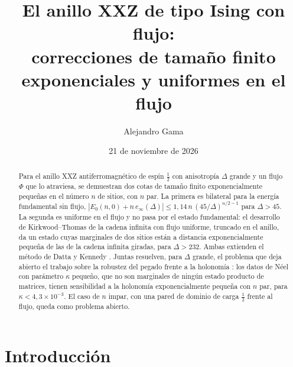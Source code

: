 \documentclass[11pt,a4paper]{article}
\title{El anillo XXZ de tipo Ising con flujo:\\ correcciones de tamaño finito exponenciales y uniformes en el flujo}
\author{Alejandro Gama}
\date{21 de noviembre de 2026}
\theoremstyle{remark}
\begin{document}
\maketitle

\begin{abstract}
Para el anillo XXZ antiferromagnético de espín $\tfrac12$ con anisotropía $\Delta$ grande y un flujo
$\Phi$ que lo atraviesa, se demuestran dos cotas de tamaño finito exponencialmente pequeñas en el
número $n$ de sitios, con $n$ par. La primera es bilateral para la energía fundamental sin flujo,
$|E_0(n,0)+n\,e_\infty(\Delta)|\le1{,}14\,n\,(45/\Delta)^{n/2-1}$ para $\Delta>45$. La segunda es uniforme en el flujo y no
pasa por el estado fundamental: el desarrollo de Kirkwood--Thomas de la cadena infinita con flujo
uniforme, truncado en el anillo, da un estado cuyas marginales de dos sitios están a distancia
exponencialmente pequeña de las de la cadena infinita giradas, para $\Delta>232$. Ambas extienden el método de
Datta y Kennedy \cite{dk-kink,dk-quasi}. Juntas resuelven, para $\Delta$ grande, el problema que
deja abierto el trabajo sobre la robustez del pegado frente a la holonomía \cite{robustez}: los
datos de Néel con parámetro $\kappa$ pequeño, que no son marginales de ningún estado producto de
matrices, tienen sensibilidad a la holonomía exponencialmente pequeña con $n$ par, para
$\kappa<4{,}3\times10^{-3}$. El caso de $n$ impar, con una pared de dominio de carga $\tfrac12$ frente al
flujo, queda como problema abierto.
\end{abstract}

\section{Introducción}
\end{document}

